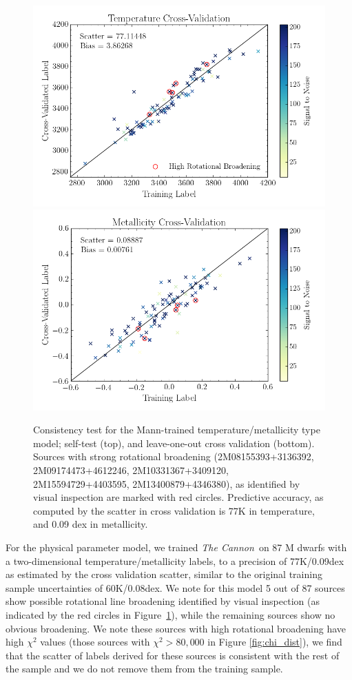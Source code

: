 \documentclass[twocolumn]{aastex62}
\newcommand{\thecannon}{\textsl{The Cannon}}
\begin{document}
\begin{figure}
	\includegraphics[width=\linewidth]{figures/crv_test_teff.png}
	\includegraphics[width=\linewidth]{figures/crv_test_fe_h.png}
	\caption{Consistency test for the Mann-trained temperature/metallicity type model; self-test (top), and leave-one-out cross validation (bottom). Sources with strong rotational broadening (2M08155393+3136392, 2M09174473+4612246, 2M10331367+3409120, 2M15594729+4403595, 2M13400879+4346380), as identified by visual inspection are marked with red circles. Predictive accuracy, as computed by the scatter in cross validation is 77K in temperature, and 0.09 dex in metallicity.} 
	\label{fig:mann_validation}
\end{figure}

For the physical parameter model, we trained \thecannon\ on 87 M dwarfs with a two-dimensional temperature/metallicity labels, to a precision of 77K/0.09dex as estimated by the cross validation scatter, similar to the original training sample uncertainties of 60K/0.08dex. We note for this model 5 out of 87 sources show possible rotational line broadening identified by visual inspection (as indicated by the red circles in Figure~\ref{fig:mann_validation}), while the remaining sources show no obvious broadening. We note these sources with high rotational broadening have high $\chi^2$ values (those sources with $\chi^2 > 80,000$ in Figure \ref{fig:chi_dist}), we find that the scatter of labels derived for these sources is consistent with the rest of the sample and we do not remove them from the training sample.
\end{document}
